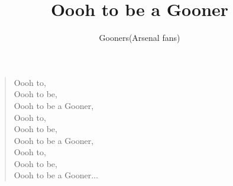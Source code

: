 \documentclass[a4paper,12pt]{article}
\title{Oooh to be a Gooner}
\author{Gooners(Arsenal fans)}
\date{}
\begin{document}
	
	\maketitle
	
	\begin{verse}
		
		Oooh to, \\
		Oooh to be, \\ 
		Oooh to be a Gooner, \\ 
		Oooh to, \\
		Oooh to be, \\ 
		Oooh to be a Gooner, \\ 
		Oooh to, \\
		Oooh to be, \\ 
		Oooh to be a Gooner$\ldots$
		
	\end{verse}
	
\end{document}
